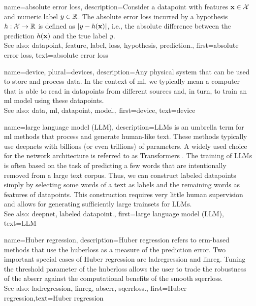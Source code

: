 {name={absolute error loss},
	description={Consider a \gls{datapoint} with \glspl{feature} ${\bf x} \in \mathcal{X}$ and numeric 
		\gls{label} $y \in \mathbb{R}$. The absolute error \gls{loss} 
		incurred by a \gls{hypothesis} $h: \mathcal{X} \rightarrow \mathbb{R}$ 
		is defined as $|y - h({\bf x})|$, i.e., the absolute difference between 
		the \gls{prediction} $h({\bf x})$ and the true \gls{label} $y$.
					\\
		See also: \gls{datapoint}, \gls{feature}, \gls{label}, \gls{loss}, \gls{hypothesis}, \gls{prediction}.},
	first={absolute error loss},
	text={absolute error loss}
}

{name={device}, plural={devices}, 
	description={Any physical system that can be used to store and process \gls{data}. In the context of \gls{ml}, 
		we typically mean a computer that is able to read in \glspl{datapoint} from different 
		sources and, in turn, to train an \gls{ml} \gls{model} using these \glspl{datapoint}.
						\\
		See also: \gls{data}, \gls{ml}, \gls{datapoint}, \gls{model}.},
	first={device},
	text={device}
}

{name={large language model (LLM)},
	description={LLMs is an umbrella term for \gls{ml} methods 
		that process and generate human-like text. These methods typically 
		use \glspl{deepnet} with billions (or even trillions) of \glspl{parameter}. 
		A widely used choice for the network architecture is referred to as 
		Transformers \cite{vaswani2017attention}. The training of LLMs is often  
		based on the task of predicting a few words that are intentionally removed 
		from a large text corpus. Thus, we can construct \glspl{labeled datapoint} 
		simply by selecting some words of a text as \glspl{label} and the remaining 
		words as \glspl{feature} of \glspl{datapoint}. This construction requires 
		very little human supervision and allows for generating sufficiently 
		large \glspl{trainset} for LLMs.
			\\
		See also: \gls{deepnet}, \gls{labeled datapoint}.},
		first={large language model (LLM)},
		text={LLM}
}


{name={Huber regression},
 description={Huber \gls{regression} refers to \gls{erm}-based methods 
			that use the \gls{huberloss} as a measure of the \gls{prediction} error. Two important special cases 
			of Huber \gls{regression} are \gls{ladregression} and \gls{linreg}. Tuning the threshold \gls{parameter} 
			of the \gls{huberloss} allows the user to trade the \gls{robustness} of the \gls{abserr} against 
			the computational benefits of the \gls{smooth} \gls{sqerrloss}.
					\\
		See also: \gls{ladregression}, \gls{linreg}, \gls{abserr}, \gls{sqerrloss}.},
			first={Huber regression},text={Huber regression}}


